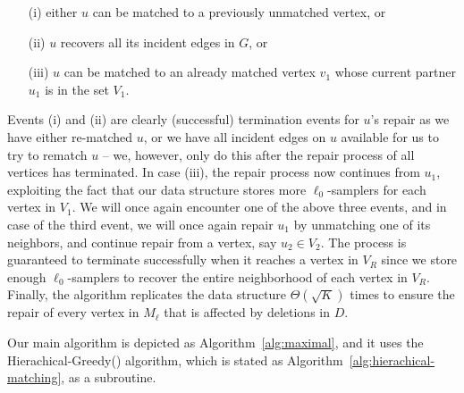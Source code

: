 \documentclass[11pt,a4paper]{article}
\begin{document}
\begin{itemize}
    \item[(i)] either $u$ can be matched to a previously unmatched vertex, or 
    \item [(ii)] $u$ recovers all its incident edges in $G$, or 
    \item [(iii)] $u$ can be matched to an already matched vertex $v_1$ whose current partner $u_1$ is in the set $V_1$.
\end{itemize}
 Events (i) and (ii) are clearly (successful) termination events for $u$'s repair as we have either re-matched $u$, or we have all incident edges on $u$ available for us to try to rematch $u$ -- we, however, only do this after the repair process of all vertices has terminated. In case (iii), the repair process now continues from $u_1$, exploiting the fact that our data structure stores more $\ell_0$-samplers for each vertex in $V_1$. We will once again encounter one of the above three events, and in case of the third event, we will once again repair $u_1$ by unmatching one of its neighbors, and continue repair from a vertex, say $u_2 \in V_2$.  The process is guaranteed to terminate successfully when it reaches a vertex in $V_R$ since we store enough $\ell_0$-samplers to recover the entire neighborhood of each vertex in $V_R$. 
Finally, the algorithm replicates the data structure $\Theta(\sqrt{K})$ times to ensure the repair of every vertex in $M_{\ell}$ that is affected by deletions in $D$. 







\iffalse
Also, let $M_1, M_2. ..., M_{\ell}$ be a sequence of hierarchical matchings constructed using only edges in $I$, processed in an arbitrary order. Then let $M$ be any matching that for every vertex $v$ matched in $M_{\ell}$, the matching $M$ either (i) matches $v$ using some edge in $E$, or (ii) has the property that for all edges $(u,v) \in E$, the end-point $u$ is matched in $M$. Then $M$ can be extended to become a maximal matching of the graph $G(V,E)$ by simply greedily adding to it edges in $(M_1 \cup M_2 \cup ... M_{\ell-1}) \setminus D$.
\fi










Our main algorithm is depicted as Algorithm~\ref{alg:maximal}, and it uses the \textsf{Hierachical-Greedy}() algorithm, which is stated as Algorithm~\ref{alg:hierachical-matching}, as a subroutine.
\end{document}
